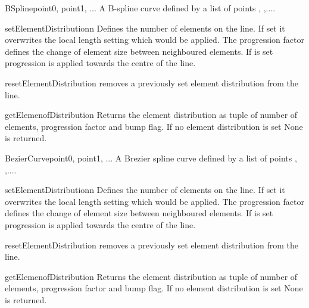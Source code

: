 \begin{classdesc}{BSpline}{point0, point1, ...}
A B-spline curve defined by a list of points , ,....
\end{classdesc}
\begin{methoddesc}[BSpline]{setElementDistribution}{n}
Defines the number of elements on the line. If set it overwrites the local length setting which would be applied. The progression factor  defines the change of element size between neighboured elements. If  is set
progression is applied towards the centre of the line.
\end{methoddesc}
\begin{methoddesc}[BSpline]{resetElementDistribution}{}
removes a previously set element distribution from the line.
\end{methoddesc}
\begin{methoddesc}[BSpline]{getElemenofDistribution}{}
Returns the element distribution as tuple of
number of elements, progression factor and bump flag. If
no element distribution is set None is returned.
\end{methoddesc}

\begin{classdesc}{BezierCurve}{point0, point1, ...}
A Brezier spline curve defined by a list of points , ,....
\end{classdesc}
\begin{methoddesc}[BezierCurve]{setElementDistribution}{n}
Defines the number of elements on the line. If set it overwrites the local length setting which would be applied. The progression factor  defines the change of element size between neighboured elements. If  is set
progression is applied towards the centre of the line.
\end{methoddesc}
\begin{methoddesc}[BezierCurve]{resetElementDistribution}{}
removes a previously set element distribution from the line.
\end{methoddesc}
\begin{methoddesc}[BezierCurve]{getElemenofDistribution}{}
Returns the element distribution as tuple of
number of elements, progression factor and bump flag. If
no element distribution is set None is returned.
\end{methoddesc}

